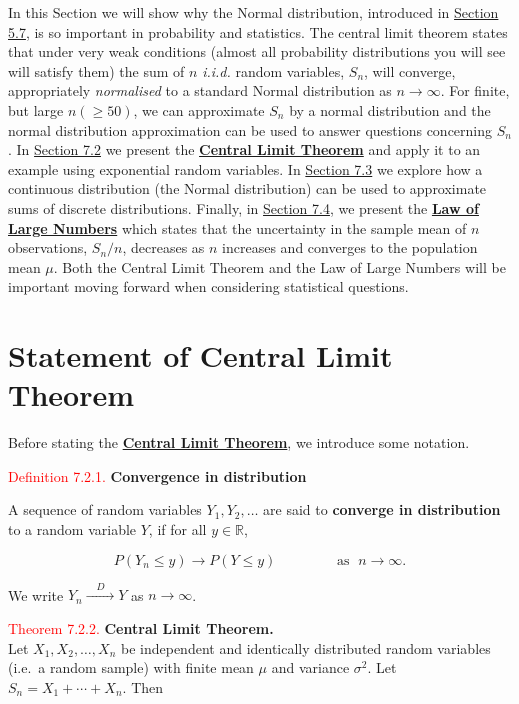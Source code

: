 \documentclass[
]{book}
\begin{document}
In this Section we will show why the Normal distribution, introduced in \protect\hyperlink{rv:normal}{Section 5.7}, is so important in probability and statistics. The central limit theorem states that under very weak conditions (almost all probability distributions you will see will satisfy them) the sum of \(n\) \emph{i.i.d.} random variables, \(S_n\), will converge, appropriately \emph{normalised} to a standard Normal distribution as \(n \to \infty\). For finite, but large \(n (\geq 50)\), we can approximate \(S_n\) by a normal distribution and the normal distribution approximation can be used to answer questions concerning \(S_n\). In \protect\hyperlink{Sec_CLT:statement}{Section 7.2} we present the \protect\hyperlink{Sec_CLT:thm:CLT}{\textbf{Central Limit Theorem}} and apply it to an example using exponential random variables. In \protect\hyperlink{Sec_CLT:discrete}{Section 7.3} we explore how a continuous distribution (the Normal distribution) can be used to approximate sums of discrete distributions. Finally, in \protect\hyperlink{Sec_CLT:LLN}{Section 7.4}, we present the \protect\hyperlink{Sec_CLT:thm:LLN}{\textbf{Law of Large Numbers}} which states that the uncertainty in the sample mean of \(n\) observations, \(S_n/n\), decreases as \(n\) increases and converges to the population mean \(\mu\). Both the Central Limit Theorem and the Law of Large Numbers will be important moving forward when considering statistical questions.

\hypertarget{Sec_CLT:statement}{%
\section{Statement of Central Limit Theorem}\label{Sec_CLT:statement}}

Before stating the \protect\hyperlink{Sec_CLT:thm:CLT}{\textbf{Central Limit Theorem}}, we introduce some notation.

\leavevmode{}%
\textcolor{red}{Definition 7.2.1.}
{\textbf{Convergence in distribution}}

A sequence of random variables \(Y_1, Y_2, \ldots\) are said to \textbf{converge in distribution} to a random variable \(Y\), if for all \(y \in \mathbb{R}\),

\[ P(Y_n \leq y) \rightarrow P(Y \leq y) \qquad \qquad \mbox{ as } \; n \to \infty. \]

We write \(Y_n \xrightarrow{\quad D \quad} Y\) as \(n \to \infty\).

\hypertarget{Sec_CLT:thm:CLT}{}
\textcolor{red}{Theorem 7.2.2.}
{\textbf{Central Limit Theorem.}}\\
Let \(X_1,X_2,\dots,X_n\) be independent and identically distributed random variables (i.e.~a random sample) with finite mean \(\mu\) and variance \(\sigma^2\). Let \(S_n = X_1 + \cdots + X_n\). Then
\end{document}
